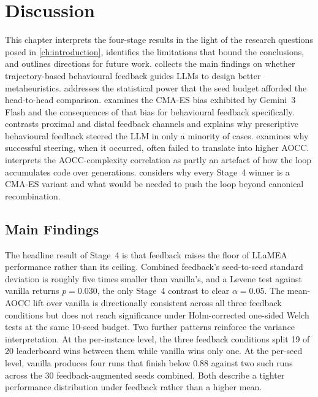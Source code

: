 
\chapter{Discussion}
\label{ch:discussion}

This chapter interprets the four-stage results in the light of the research questions posed in \cref{ch:introduction}, identifies the limitations that bound the conclusions, and outlines directions for future work.  collects the main findings on whether trajectory-based behavioural feedback guides LLMs to design better metaheuristics.  addresses the statistical power that the seed budget afforded the head-to-head comparison.  examines the CMA-ES bias exhibited by Gemini~3 Flash and the consequences of that bias for behavioural feedback specifically.  contrasts proximal and distal feedback channels and explains why prescriptive behavioural feedback steered the LLM in only a minority of cases.  examines why successful steering, when it occurred, often failed to translate into higher AOCC.  interprets the AOCC-complexity correlation as partly an artefact of how the loop accumulates code over generations.  considers why every Stage~4 winner is a CMA-ES variant and what would be needed to push the loop beyond canonical recombination.

\section{Main Findings}
\label{sec:discussion-findings}

The headline result of Stage~4 is that feedback raises the floor of LLaMEA performance rather than its ceiling. Combined feedback's seed-to-seed standard deviation is roughly five times smaller than vanilla's, and a Levene test against vanilla returns $p = 0.030$, the only Stage~4 contrast to clear $\alpha = 0.05$. The mean-AOCC lift over vanilla is directionally consistent across all three feedback conditions but does not reach significance under Holm-corrected one-sided Welch tests at the same 10-seed budget. Two further patterns reinforce the variance interpretation. At the per-instance level, the three feedback conditions split 19 of 20 leaderboard wins between them while vanilla wins only one. At the per-seed level, vanilla produces four runs that finish below $0.88$ against two such runs across the 30 feedback-augmented seeds combined. Both describe a tighter performance distribution under feedback rather than a higher mean.

